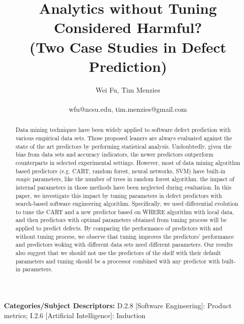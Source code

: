 \documentclass{sig-alternative}
\begin{document}
\title{Analytics without Tuning Considered Harmful?\\(Two Case Studies in Defect Prediction)}
\author{
\alignauthor
Wei Fu, Tim Menzies\\
       \\
       {wfu@ncsu.edu, tim.menzies@gmail.com}} 


 
\maketitle
\begin{abstract}
Data mining techniques have been widely applied to software defect prediction with various 
empirical data sets. Those proposed leaners are always evaluated against the state of the art 
predictors by performing statistical analysis. Undoubtedly, given the bias from data sets and 
accuracy indicators, the newer predictors outperform counterparts in selected experimental 
settings. However,  most of data mining algorithm based predictors (e.g. CART, random 
forest, 
neural networks, SVM) have built-in {\it magic} parameters, like the number of trees in random 
forest algorithm. the impact of internal parameters in those methods have been neglected 
during evaluation. In this paper, we investigate this impact by tuning parameters in defect 
predictors with search-based software engineering algorithm. Specifically, we used differential 
evolution to tune the CART and a new predictor based on WHERE algorithm with local data, 
and then predictors with optimal parameters obtained from tuning process will be applied to 
predict defects. By comparing the performance of predictors with and without tuning process,  
we observe that tuning improves the predictors' performance and predictors woking with 
different data sets need different parameters. Our results also suggest that we should not use 
the predictors of the shelf with their default parameters and tuning should be a processor 
combined with any predictor with built-in parameters.



\end{abstract}

\vspace{1mm}
\noindent
{\bf Categories/Subject Descriptors:} 
D.2.8 [Software Engineering]: Product metrics;
I.2.6 [Artificial Intelligence]: Induction
\end{document}
